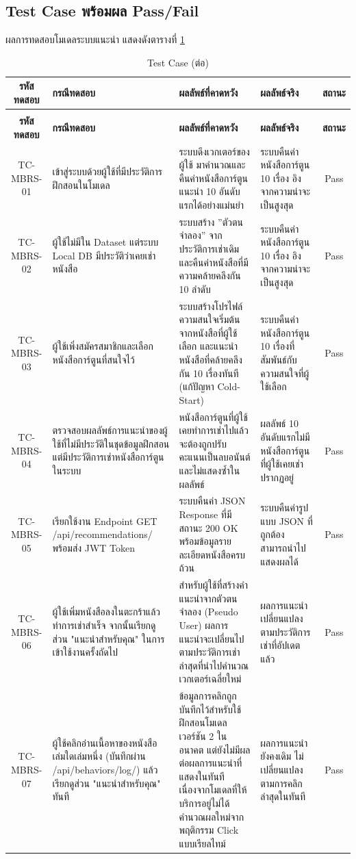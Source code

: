\subsection{Test Case พร้อมผล Pass/Fail}

ผลการทดสอบโมเดลระบบแนะนำ แสดงดังตารางที่ \ref{tab:ch4_33}

\begin{longtable}{|c|p{3cm}|p{3.5cm}|p{3.5cm}|c|}
\caption{Test Case} \label{tab:ch4_33} \\
\hline
\textbf{รหัสทดสอบ} & \textbf{กรณีทดสอบ} & \textbf{ผลลัพธ์ที่คาดหวัง} & \textbf{ผลลัพธ์จริง} & \textbf{สถานะ} \\ \hline
\endfirsthead
\caption[]{Test Case (ต่อ)} \\
\hline
\textbf{รหัสทดสอบ} & \textbf{กรณีทดสอบ} & \textbf{ผลลัพธ์ที่คาดหวัง} & \textbf{ผลลัพธ์จริง} & \textbf{สถานะ} \\ \hline
\endhead
TC-MBRS-01 & เข้าสู่ระบบด้วยผู้ใช้ที่มีประวัติการฝึกสอนในโมเดล & ระบบดึงเวกเตอร์ของผู้ใช้ มาคำนวณและคืนค่าหนังสือการ์ตูนแนะนำ 10 อันดับแรกได้อย่างแม่นยำ & ระบบคืนค่าหนังสือการ์ตูน 10 เรื่อง อิงจากความน่าจะเป็นสูงสุด & Pass \\ \hline
TC-MBRS-02 & ผู้ใช้ไม่มีใน Dataset แต่ระบบ Local DB มีประวัติว่าเคยเช่าหนังสือ & ระบบสร้าง ''ตัวตนจำลอง'' จากประวัติการเช่าเดิม และคืนค่าหนังสือที่มีความคล้ายคลึงกัน 10 ลำดับ & ระบบคืนค่าหนังสือการ์ตูน 10 เรื่อง อิงจากความน่าจะเป็นสูงสุด & Pass \\ \hline
TC-MBRS-03 & ผู้ใช้เพิ่งสมัครสมาชิกและเลือกหนังสือการ์ตูนที่สนใจไว้ & ระบบสร้างโปรไฟล์ความสนใจเริ่มต้นจากหนังสือที่ผู้ใช้เลือก และแนะนำหนังสือที่คล้ายคลึงกัน 10 เรื่องทันที (แก้ปัญหา Cold-Start) & ระบบคืนค่าหนังสือการ์ตูน 10 เรื่องที่สัมพันธ์กับความสนใจที่ผู้ใช้เลือก & Pass \\ \hline
TC-MBRS-04 & ตรวจสอบผลลัพธ์การแนะนำของผู้ใช้ที่ไม่มีประวัติในชุดข้อมูลฝึกสอนแต่มีประวัติการเช่าหนังสือการ์ตูนในระบบ & หนังสือการ์ตูนที่ผู้ใช้เคยทำการเช่าไปแล้ว จะต้องถูกปรับคะแนนเป็นลบอนันต์ และไม่แสดงซ้ำในผลลัพธ์ & ผลลัพธ์ 10 อันดับแรกไม่มีหนังสือการ์ตูนที่ผู้ใช้เคยเช่าปรากฏอยู่ & Pass \\ \hline
TC-MBRS-05 & เรียกใช้งาน Endpoint GET /api/recommendations/ พร้อมส่ง JWT Token & ระบบคืนค่า JSON Response ที่มีสถานะ 200 OK พร้อมข้อมูลรายละเอียดหนังสือครบถ้วน & ระบบคืนค่ารูปแบบ JSON ที่ถูกต้อง สามารถนำไปแสดงผลได้ & Pass \\ \hline
TC-MBRS-06 & ผู้ใช้เพิ่มหนังสือลงในตะกร้าแล้วทำการเช่าสำเร็จ จากนั้นเรียกดูส่วน "แนะนำสำหรับคุณ" ในการเข้าใช้งานครั้งถัดไป & สำหรับผู้ใช้ที่สร้างคำแนะนำจากตัวตนจำลอง (Pseudo User) ผลการแนะนำจะเปลี่ยนไปตามประวัติการเช่าล่าสุดที่นำไปคำนวณเวกเตอร์เฉลี่ยใหม่ & ผลการแนะนำเปลี่ยนแปลงตามประวัติการเช่าที่อัปเดตแล้ว & Pass \\ \hline
TC-MBRS-07 & ผู้ใช้คลิกอ่านเนื้อหาของหนังสือเล่มใดเล่มหนึ่ง (บันทึกผ่าน /api/behaviors/log/) แล้วเรียกดูส่วน "แนะนำสำหรับคุณ" ทันที & ข้อมูลการคลิกถูกบันทึกไว้สำหรับใช้ฝึกสอนโมเดลเวอร์ชัน 2 ในอนาคต แต่ยังไม่มีผลต่อผลการแนะนำที่แสดงในทันที เนื่องจากโมเดลที่ให้บริการอยู่ไม่ได้คำนวณผลใหม่จากพฤติกรรม Click แบบเรียลไทม์ & ผลการแนะนำยังคงเดิม ไม่เปลี่ยนแปลงตามการคลิกล่าสุดในทันที & Pass \\ \hline
\end{longtable}


